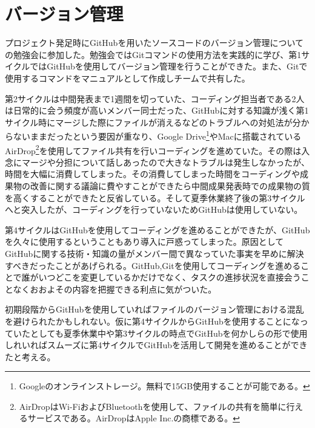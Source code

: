 \section{バージョン管理}
プロジェクト発足時にGitHubを用いたソースコードのバージョン管理についての勉強会に参加した。勉強会ではGitコマンドの使用方法を実践的に学び、第1サイクルではGitHubを使用してバージョン管理を行うことができた。また、Gitで使用するコマンドをマニュアルとして作成しチームで共有した。
\par 第2サイクルは中間発表まで1週間を切っていた、コーディング担当者である2人は日常的に会う頻度が高いメンバー同士だった、GitHubに対する知識が浅く第1サイクル時にマージした際にファイルが消えるなどのトラブルへの対処法が分からないままだったという要因が重なり、Google Drive\footnote{Googleのオンラインストレージ。無料で15GB使用することが可能である。}やMacに搭載されているAirDrop\footnote{AirDropはWi-FiおよびBluetoothを使用して、ファイルの共有を簡単に行えるサービスである。AirDropはApple Inc.の商標である。}を使用してファイル共有を行いコーディングを進めていた。その際は入念にマージや分担について話しあったので大きなトラブルは発生しなかったが、時間を大幅に消費してしまった。その消費してしまった時間をコーディングや成果物の改善に関する議論に費やすことができたら中間成果発表時での成果物の質を高くすることができたと反省している。そして夏季休業終了後の第3サイクルへと突入したが、コーディングを行っていないためGitHubは使用していない。
\par 第4サイクルはGitHubを使用してコーディングを進めることができたが、GitHubを久々に使用するということもあり導入に戸惑ってしまった。原因としてGitHubに関する技術・知識の量がメンバー間で異なっていた事実を早めに解決すべきだったことがあげられる。GitHub,Gitを使用してコーディングを進めることで誰がいつどこを変更しているかだけでなく、タスクの進捗状況を直接会うことなくおおよその内容を把握できる利点に気がついた。
\par  初期段階からGitHubを使用していればファイルのバージョン管理における混乱を避けられたかもしれない。仮に第4サイクルからGitHubを使用することになっていたとしても夏季休業中や第3サイクルの時点でGitHubを何かしらの形で使用しれいればスムーズに第4サイクルでGitHubを活用して開発を進めることができたと考える。
